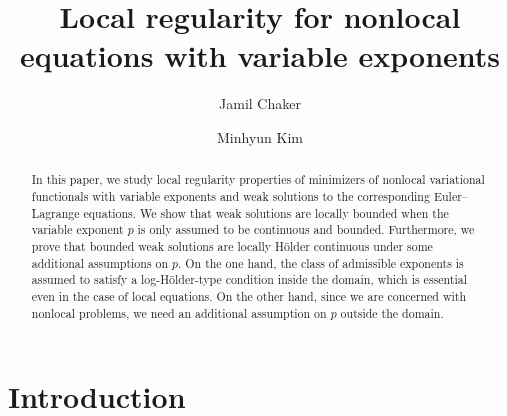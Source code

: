 \documentclass[11pt]{amsart}
\title[]{Local regularity for nonlocal equations with variable exponents}
\author{Jamil Chaker}
\author{Minhyun Kim}
\theoremstyle{plain}
\theoremstyle{definition}
\numberwithin{equation}{section}
\begin{document}
\begin{abstract}
In this paper, we study local regularity properties of minimizers of nonlocal variational functionals with variable exponents and weak solutions to the corresponding Euler--Lagrange equations. We show that weak solutions are locally bounded when the variable exponent $p$ is only assumed to be continuous and bounded. Furthermore, we prove that bounded weak solutions are locally H\"older continuous under some additional assumptions on $p$. On the one hand, the class of admissible exponents is assumed to satisfy a log-H\"older-type condition inside the domain, which is essential even in the case of local equations. On the other hand, since we are concerned with nonlocal problems, we need an additional assumption on $p$ outside the domain.
\end{abstract}

\maketitle









\section{Introduction} \label{sec:introduction}
\end{document}

